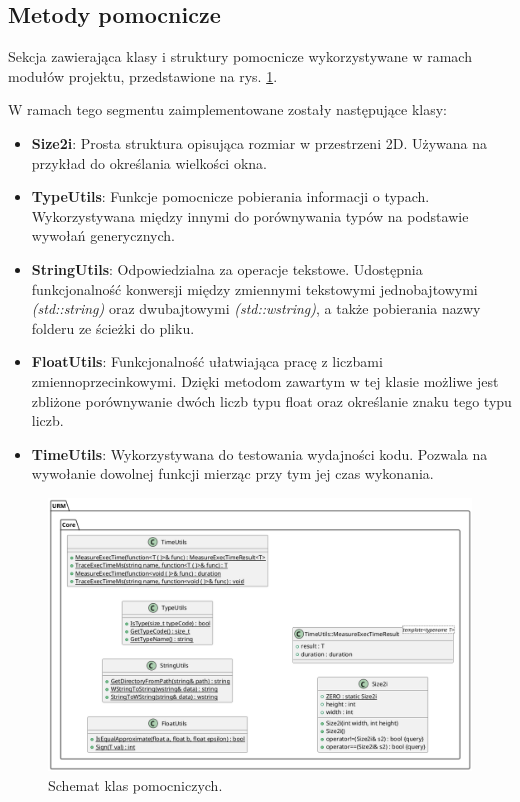 	\vfill
	\clearpage
	
\subsection{Metody pomocnicze}
	Sekcja zawierająca klasy i struktury pomocnicze wykorzystywane w ramach modułów projektu, przedstawione na rys. \ref{UML_Utils}.
	
	W ramach tego segmentu zaimplementowane zostały następujące klasy:
	\begin{itemize}
		\item \textbf{Size2i}: Prosta struktura opisująca rozmiar w przestrzeni 2D. Używana na przykład do określania wielkości okna.
		\item \textbf{TypeUtils}: Funkcje pomocnicze pobierania informacji o typach. Wykorzystywana między innymi do porównywania typów na podstawie wywołań generycznych.
		\item \textbf{StringUtils}: Odpowiedzialna za operacje tekstowe. Udostępnia funkcjonalność konwersji między zmiennymi tekstowymi jednobajtowymi \textit{(std::string)} oraz dwubajtowymi \textit{(std::wstring)}, a także pobierania nazwy folderu ze ścieżki do pliku.
		\item \textbf{FloatUtils}: Funkcjonalność ułatwiająca pracę z liczbami zmiennoprzecinkowymi. Dzięki metodom zawartym w tej klasie możliwe jest zbliżone porównywanie dwóch liczb typu float oraz określanie znaku tego typu liczb.
		\item \textbf{TimeUtils}: Wykorzystywana do testowania wydajności kodu. Pozwala na wywołanie dowolnej funkcji mierząc przy tym jej czas wykonania.
	\end{itemize}
	
	\begin{figure}[h!]
		\centering
		\includegraphics[width=\textwidth]{images/UML/utils.png}
		\caption{Schemat klas pomocniczych.}
		\label{UML_Utils}
	\end{figure}
	

